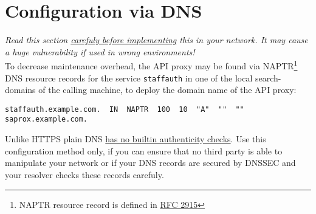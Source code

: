 %
%
%
%
%
%
%


\section{Configuration via DNS}

\textit{Read this section \ul{carefuly before implementing} this in your
network. It may cause a huge vulnerability if used in wrong environments!} \\

To decrease maintenance overhead, the API proxy may be found via
NAPTR\footnote{NAPTR resource record is defined in
\href{https://tools.ietf.org/html/rfc2915}{RFC 2915}} DNS resource records for
the service \verb+staffauth+ in one of the local search-domains of the calling
machine, to deploy the domain name of the API proxy: \\

\begin{lstlisting}[language=none, numbers=none]
staffauth.example.com.  IN  NAPTR  100  10  "A"  ""  ""  saprox.example.com.
\end{lstlisting}

\vspace{0.5cm}

Unlike HTTPS plain DNS \ul{has no builtin authenticity checks}. Use this
configuration method only, if you can ensure that no third party is able to
manipulate your network or if your DNS records are secured by DNSSEC and your
resolver checks these records carefuly.
